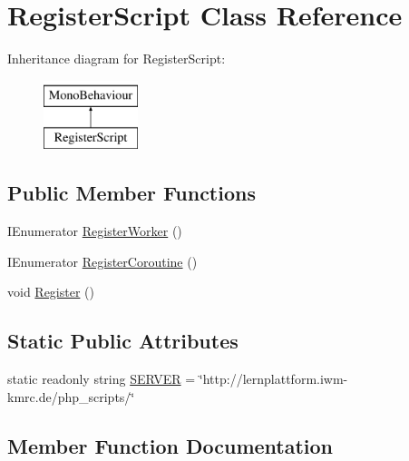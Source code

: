 \hypertarget{classRegisterScript}{}\section{Register\+Script Class Reference}
\label{classRegisterScript}
Inheritance diagram for Register\+Script\+:\begin{figure}[H]
\begin{center}
\leavevmode
\includegraphics[height=2.000000cm]{classRegisterScript}
\end{center}
\end{figure}
\subsection*{Public Member Functions}
\begin{DoxyCompactItemize}
\item 
I\+Enumerator \hyperlink{classRegisterScript_aa42f645e1748bf12f8b4cb1adb8b5a67}{Register\+Worker} ()
\item 
I\+Enumerator \hyperlink{classRegisterScript_afb80414e3a9215df36707a4ce234a09f}{Register\+Coroutine} ()
\item 
void \hyperlink{classRegisterScript_a026aba8189f8df62aa2abfe7543df600}{Register} ()
\end{DoxyCompactItemize}
\subsection*{Static Public Attributes}
\begin{DoxyCompactItemize}
\item 
static readonly string \hyperlink{classRegisterScript_a300c86d8cdf3d1d5fadf552783266259}{S\+E\+R\+V\+ER} = \char`\"{}http\+://lernplattform.\+iwm-\/kmrc.\+de/php\+\_\+scripts/\char`\"{}
\end{DoxyCompactItemize}


\subsection{Member Function Documentation}
\mbox{\label{classRegisterScript_a026aba8189f8df62aa2abfe7543df600}} 
